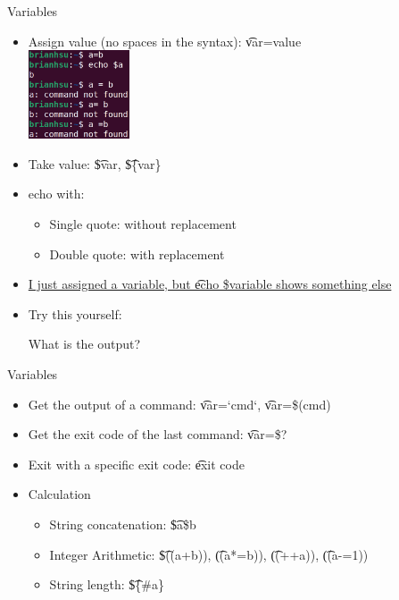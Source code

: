 \begin{frame}[fragile]{Variables}
\begin{multicols}{2}
\begin{itemize}
\item Assign value (no spaces in the syntax): \t{var=value}\\
\includegraphics[width=3cm]{varassign.png}
\item Take value: \t{\$var}, \t{\$\{var\}}
\item echo with:
\begin{itemize}
\item Single quote: without replacement
\item Double quote: with replacement
\end{itemize}
\item \href{https://stackoverflow.com/questions/29378566/i-just-assigned-a-variable-but-echo-variable-shows-something-else}{I just assigned a variable, but \t{echo \$variable} shows something else}
\item Try this yourself:

What is the output?
\end{itemize}
\end{multicols}
\end{frame}

\begin{frame}{Variables}
\begin{itemize}
\item Get the output of a command: \t{var=`cmd`}, \t{var=\$(cmd)}
\item Get the exit code of the last command: \t{var=\$?}
\item Exit with a specific exit code: \t{exit code}
\item Calculation
\begin{itemize}
\item String concatenation: \t{\$a\$b}
\item Integer Arithmetic: \t{\$((a+b))}, \t{((a*=b))}, \t{((++a))}, \t{((a-=1))}
\item String length: \t{\$\{\#a\}}
\end{itemize}
\end{itemize}
\end{frame}

